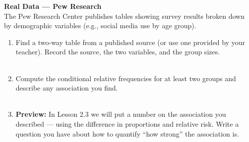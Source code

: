 \documentclass[10pt]{article}
\begin{document}
\vspace{0.14in}

\begin{extensionbox}
\small
\textbf{Real Data --- Pew Research}\\[4pt]
The Pew Research Center publishes tables showing survey results broken down by
demographic variables (e.g., social media use by age group).
\begin{enumerate}[leftmargin=1.5em, itemsep=8pt]
  \item Find a two-way table from a published source (or use one provided by your teacher).
        Record the source, the two variables, and the group sizes.\\[4pt]
        \writeline\\[1pt]\writeline

  \item Compute the conditional relative frequencies for at least two groups and describe
        any association you find.\\[4pt]
        \writeline\\[1pt]\writeline

  \item \textbf{Preview:} In Lesson 2.3 we will put a number on the association you described
        --- using the difference in proportions and relative risk. Write a question you have about
        how to quantify ``how strong'' the association is.\\[4pt]
        \writeline\\[1pt]\writeline
\end{enumerate}
\end{extensionbox}
\end{document}
